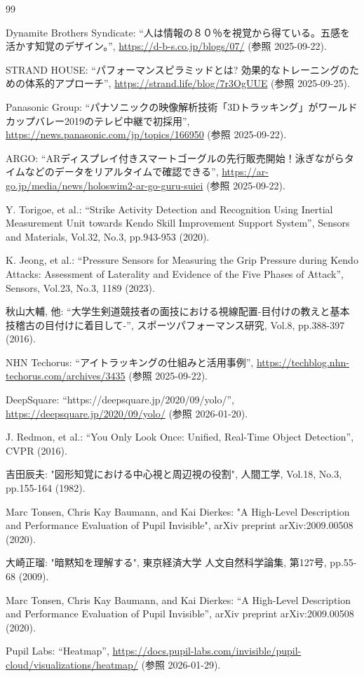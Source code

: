 \documentclass[dvipdfmx]{ujreport}
\begin{document}
\begin{thebibliography}{99}

 Dynamite Brothers Syndicate: ``人は情報の８０％を視覚から得ている。五感を活かす知覚のデザイン。'', \url{https://d-b-s.co.jp/blogs/07/} (参照 2025-09-22).

 STRAND HOUSE: ``パフォーマンスピラミッドとは? 効果的なトレーニングのための体系的アプローチ'', \url{https://strand.life/blog/7r3OgUUE} (参照 2025-09-25).

 Panasonic Group: ``パナソニックの映像解析技術「3Dトラッキング」がワールドカップバレー2019のテレビ中継で初採用'', \url{https://news.panasonic.com/jp/topics/166950} (参照 2025-09-22).

 ARGO: ``ARディスプレイ付きスマートゴーグルの先行販売開始！泳ぎながらタイムなどのデータをリアルタイムで確認できる'', \url{https://ar-go.jp/media/news/holoswim2-ar-go-guru-suiei} (参照 2025-09-22).

 Y. Torigoe, et al.: ``Strike Activity Detection and Recognition Using Inertial Measurement Unit towards Kendo Skill Improvement Support System'', Sensors and Materials, Vol.32, No.3, pp.943-953 (2020).

 K. Jeong, et al.: ``Pressure Sensors for Measuring the Grip Pressure during Kendo Attacks: Assessment of Laterality and Evidence of the Five Phases of Attack'', Sensors, Vol.23, No.3, 1189 (2023).

 秋山大輔, 他: ``大学生剣道競技者の面技における視線配置-目付けの教えと基本技稽古の目付けに着目して-'', スポーツパフォーマンス研究, Vol.8, pp.388-397 (2016).

 NHN Techorus: ``アイトラッキングの仕組みと活用事例'', \url{https://techblog.nhn-techorus.com/archives/3435} (参照 2025-09-22).

 DeepSquare: ``https://deepsquare.jp/2020/09/yolo/'', \url{https://deepsquare.jp/2020/09/yolo/} (参照 2026-01-20).

 J. Redmon, et al.: ``You Only Look Once: Unified, Real-Time Object Detection'', CVPR (2016).

 吉田辰夫: "図形知覚における中心視と周辺視の役割", 人間工学, Vol.18, No.3, pp.155-164 (1982).

 Marc Tonsen, Chris Kay Baumann, and Kai Dierkes: "A High-Level Description and Performance Evaluation of Pupil Invisible", arXiv preprint arXiv:2009.00508 (2020).

 大崎正瑠: "暗黙知を理解する", 東京経済大学 人文自然科学論集, 第127号, pp.55-68 (2009).

 Marc Tonsen, Chris Kay Baumann, and Kai Dierkes: ``A High-Level Description and Performance Evaluation of Pupil Invisible'', arXiv preprint arXiv:2009.00508 (2020).

 Pupil Labs: ``Heatmap'', \url{https://docs.pupil-labs.com/invisible/pupil-cloud/visualizations/heatmap/} (参照 2026-01-29).
\end{thebibliography}

\end{document}
